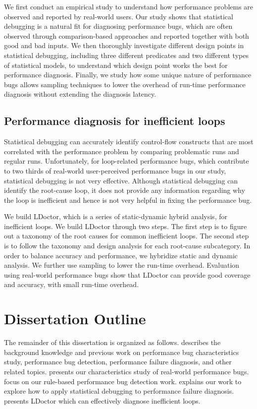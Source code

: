 We first conduct an empirical study to understand how performance problems are observed and reported by real-world users. 
Our study shows that statistical debugging is a natural fit for diagnosing performance bugs, 
which are often observed through comparison-based approaches and reported together with both good and bad inputs. 
We then thoroughly investigate different design points in statistical debugging, 
including three different predicates and two different types of statistical models, 
to understand which design point works the best for performance diagnosis. 
Finally, we study how some unique nature of performance bugs allows sampling techniques 
to lower the overhead of run-time performance diagnosis without extending the diagnosis latency. 

\subsection{Performance diagnosis for inefficient loops}
Statistical debugging can accurately identify control-flow constructs 
that are most correlated with the performance problem by comparing problematic runs and regular runs. 
Unfortunately, for loop-related performance bugs, which contribute to
two thirds of real-world user-perceived performance bugs in our study, 
statistical debugging is not very effective.
Although statistical debugging can identify the root-cause loop, it does
not provide any information regarding why the loop is inefficient 
and hence is not very helpful in fixing the performance bug.

We build LDoctor, which is a series of static-dynamic hybrid analysis, for inefficient loops. 
We build LDoctor through two steps. 
The first step is to figure out a taxonomy of the root causes for common inefficient loops. 
The second step is to follow the taxonomy and design analysis for each root-cause subcategory. 
In order to balance accuracy and performance, we hybridize static and dynamic analysis. 
We further use sampling to lower the run-time overhead. 
Evaluation using real-world performance bugs show that LDoctor can provide good coverage and accuracy, 
with small run-time overhead.

\section{Dissertation Outline}
The remainder of this dissertation is organized as follows. 
 describes the background knowledge and previous work on performance bug characteristics study, performance bug detection, performance failure diagnosis, and other related topics. 
 presents our characteristics study of real-world performance bugs. 
 focus on our rule-based performance bug detection work. 
 explains our work to explore how to apply statistical debugging to performance failure diagnosis. 
 presents LDoctor which can effectively diagnose inefficient loops. 
